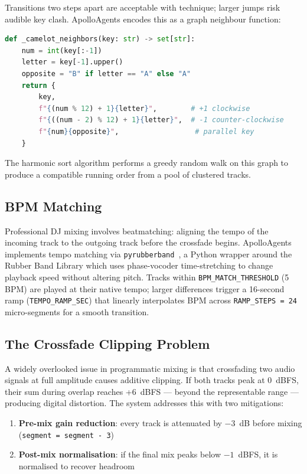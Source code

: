 \documentclass[11pt,a4paper]{article}
\begin{document}
Transitions two steps apart are acceptable with technique; larger jumps risk
audible key clash. ApolloAgents encodes this as a graph neighbour function:

\begin{lstlisting}[language=Python]
def _camelot_neighbors(key: str) -> set[str]:
    num = int(key[:-1])
    letter = key[-1].upper()
    opposite = "B" if letter == "A" else "A"
    return {
        key,
        f"{(num % 12) + 1}{letter}",        # +1 clockwise
        f"{((num - 2) % 12) + 1}{letter}",  # -1 counter-clockwise
        f"{num}{opposite}",                  # parallel key
    }
\end{lstlisting}

The harmonic sort algorithm performs a greedy random walk on this graph to
produce a compatible running order from a pool of clustered tracks.

\subsection{BPM Matching}

Professional DJ mixing involves beatmatching: aligning the tempo of the
incoming track to the outgoing track before the crossfade begins.
ApolloAgents implements tempo matching via \texttt{pyrubberband}~\cite{rubberband},
a Python wrapper around the Rubber Band Library which uses phase-vocoder
time-stretching to change playback speed without altering pitch. Tracks within
\texttt{BPM\_MATCH\_THRESHOLD} (5 BPM) are played at their native tempo;
larger differences trigger a 16-second ramp (\texttt{TEMPO\_RAMP\_SEC}) that
linearly interpolates BPM across \texttt{RAMP\_STEPS = 24} micro-segments for
a smooth transition.

\subsection{The Crossfade Clipping Problem}

A widely overlooked issue in programmatic mixing is that crossfading two audio
signals at full amplitude causes additive clipping. If both tracks peak at
0~dBFS, their sum during overlap reaches +6~dBFS --- beyond the representable
range --- producing digital distortion. The system addresses this with two
mitigations:

\begin{enumerate}
  \item \textbf{Pre-mix gain reduction}: every track is attenuated by $-3$~dB
        before mixing (\texttt{segment = segment - 3})
  \item \textbf{Post-mix normalisation}: if the final mix peaks below
        $-1$~dBFS, it is normalised to recover headroom
\end{enumerate}
\end{document}
